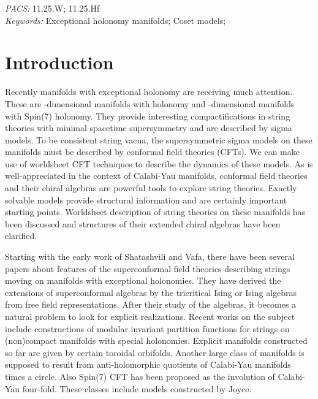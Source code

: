 \documentclass[a4paper,12pt]{article}
\numberwithin{equation}{section}
\providecommand{\Zb}{\mathbb{Z}}
\providecommand{\Ncal}{{\cal N}}
\providecommand{\Spin}[1]{{\rm Spin}(#1)}
\begin{document}
\vspace{5mm}
\noindent
{\it PACS:} 11.25.W; 11.25.Hf\\
{\it Keywords:} Exceptional holonomy manifolds; Coset models;
\newpage

\section{Introduction}
Recently manifolds with exceptional holonomy are receiving much 
attention. These are \coordHE{}-dimensional manifolds with \coordHE{} holonomy and 
\coordHE{}-dimensional manifolds with \Spin 7 holonomy. They provide 
interesting compactifications in string theories with minimal spacetime 
supersymmetry and are described by sigma models. To be consistent string 
vacua, the supersymmetric sigma models on these manifolds must be 
described by conformal field theories (CFTs). We can make use of 
worldsheet CFT techniques to describe the dynamics of these models. As 
is well-appreciated in the context of Calabi-Yau manifolds, conformal 
field theories and their chiral algebras are powerful tools to explore 
string theories. Exactly solvable models provide structural information 
and are certainly important starting points. Worldsheet description of 
string theories on these manifolds has been discussed and structures of 
their extended chiral algebras have been clarified.


Starting with the early work of Shatashvili and 
Vafa\cite{Shatashvili:1994zw}, there have been several papers about 
features of the superconformal field theories describing strings moving 
on manifolds with exceptional 
holonomies\cite{Figueroa-O'Farrill:1997hm,Gepner:2001px,Eguchi:2001xa,%
Sugiyama:2001qh,Blumenhagen:2001jb,Roiban:2001cp,Eguchi:2001ip,%
Blumenhagen:2001qx, Noyvert:2002mc,Roiban:2002iv,Naka:2002}.  They have derived 
the extensions of \myHighlight{$\Ncal=1$}\coordHE{} superconformal algebras by the tricritical 
Ising or Ising algebras from free field representations.  After their 
study of the algebras, it becomes a natural problem to look for explicit 
realizations.  Recent works on the subject include constructions of 
modular invariant partition functions for strings on (non)compact 
manifolds with special holonomies.  Explicit \coordHE{} manifolds constructed 
so far are given by certain toroidal orbifolds.  Another large class 
of \coordHE{} manifolds is supposed to result from anti-holomorphic 
\myHighlight{$\Zb_2$}\coordHE{} quotients of Calabi-Yau manifolds times a circle.  Also \Spin 7 
CFT has been proposed as the \myHighlight{$\Zb_2$}\coordHE{} involution of Calabi-Yau four-fold. 
These classes include models constructed by 
Joyce\cite{Joyce1,Joyce2,Joyce3}.
\end{document}

